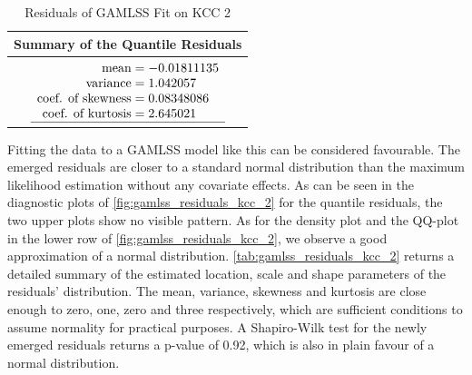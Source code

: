 \begin{table}[H]
\centering
\begin{tabular}{c}
\hline
\rowcolor{white} 
\textbf{Summary of the Quantile Residuals} \\ \hline\hline
 $\begin{array}[t]{ r @{{}={}} l }
\text{mean} & -0.01811135                         \\ 
\text{variance} & 1.042057                        \\ 
\text{coef. of skewness} & 0.08348086             \\ 
\text{coef. of kurtosis} & 2.645021               \\ \hline
\end{array}$
\end{tabular}
\caption{Residuals of GAMLSS Fit on KCC 2}
\label{tab:gamlss_residuals_kcc_2}
\end{table}



Fitting the data to a \ac{GAMLSS} model like this can be considered favourable. The emerged residuals are closer to a standard normal distribution than the maximum likelihood estimation without any covariate effects. As can be seen in the diagnostic plots of \autoref{fig:gamlss_residuals_kcc_2} for the quantile residuals, the two upper plots show no visible pattern. As for the density plot and the QQ-plot in the lower row of \autoref{fig:gamlss_residuals_kcc_2}, we observe a good approximation of a normal distribution. \autoref{tab:gamlss_residuals_kcc_2} returns a detailed summary of the estimated location, scale and shape parameters of the residuals' distribution. The mean, variance, skewness and kurtosis are close enough to zero, one, zero and three respectively, which are sufficient conditions to assume normality for practical purposes. A Shapiro-Wilk test for the newly emerged residuals returns a p-value of 0.92, which is also in plain favour of a normal distribution.
\\


